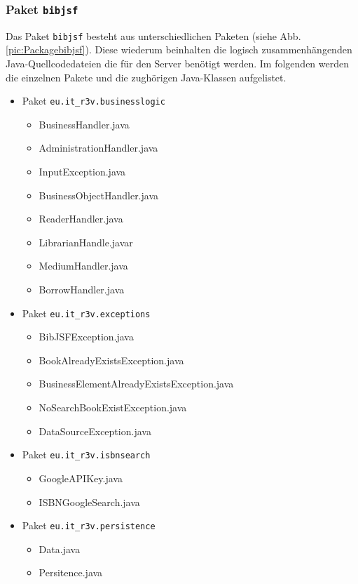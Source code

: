 \documentclass[fontsize=12pt,paper=a4,twoside]{scrartcl}
\begin{document}
\newpage
\subsubsection{Paket \texttt{bibjsf}}
\label{sec:bibclient}

Das Paket \texttt{bibjsf} besteht aus unterschiedlichen Paketen (siehe Abb. \vref{pic:Packagebibjsf}). Diese wiederum beinhalten die logisch zusammenhängenden Java-Quellcodedateien die für den Server benötigt werden. Im folgenden werden die einzelnen Pakete und die zughörigen Java-Klassen aufgelistet. 

\begin{itemize}
\item{Paket \texttt{eu.it\_r3v.businesslogic}}

\begin{itemize}
\item{BusinessHandler.java}
\item{AdministrationHandler.java}
\item{InputException.java}
\item{BusinessObjectHandler.java}
\item{ReaderHandler.java}
\item{LibrarianHandle.javar}
\item{MediumHandler.java}
\item{BorrowHandler.java}
\end{itemize}

\item{Paket \texttt{eu.it\_r3v.exceptions}}

\begin{itemize}
\item{BibJSFException.java}
\item{BookAlreadyExistsException.java}
\item{BusinessElementAlreadyExistsException.java}
\item{NoSearchBookExistException.java}
\item{DataSourceException.java}
\end{itemize}

\item{Paket \texttt{eu.it\_r3v.isbnsearch}}

\begin{itemize}
\item{GoogleAPIKey.java}
\item{ISBNGoogleSearch.java}
\end{itemize}

\item{Paket \texttt{eu.it\_r3v.persistence}}
\begin{itemize}
\item{Data.java}
\item{Persitence.java}
\end{itemize}


\end{itemize}
\end{document}
